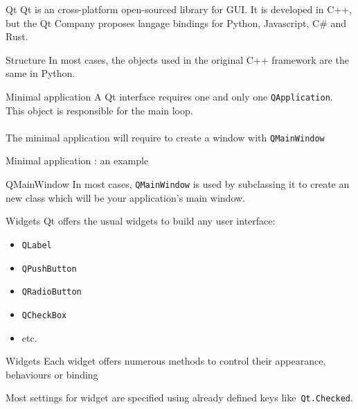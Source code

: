 \begin{frame}{Qt}
    \vfill
    \alert{Qt} is an cross-platform open-sourced library for GUI.
    \vfill
    It is developed in C++, but the Qt Company proposes langage bindings for Python, Javascript, C\# and Rust.
    \vfill
    \vfill
\end{frame}

\begin{frame}{Structure}
    In most cases,  the objects used in the original C++ framework are the same in Python.
\end{frame}
\begin{frame}{Minimal application}
    A Qt interface requires one and only one \texttt{QApplication}. This object is responsible for the main loop.\\\\
    The minimal application will require to create a window with \texttt{QMainWindow}
\end{frame}

\begin{frame}{Minimal application : an example}
\end{frame}

\begin{frame}{QMainWindow}
    In most cases, \texttt{QMainWindow} is used by subclassing it to create an new class which will be your application's main window.
\end{frame}

\begin{frame}{Widgets}
    Qt offers the usual widgets to build any user interface:
    \begin{itemize}
        \item \texttt{QLabel}
        \item \texttt{QPushButton}
        \item \texttt{QRadioButton}
        \item \texttt{QCheckBox}
        \item etc.
    \end{itemize}
\end{frame}

\begin{frame}{Widgets}
    Each widget offers numerous methods to control their appearance, behaviours or binding
    
    
    Most settings for widget are specified using already defined keys like~\texttt{Qt.Checked}.
\end{frame}

